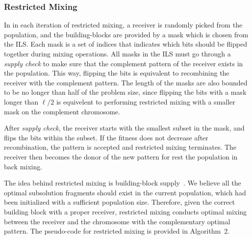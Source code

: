 \documentclass{sig-alternate-05-2015}
\begin{document}
\subsubsection{Restricted Mixing}

In in each iteration of restricted mixing, a receiver is randomly picked from the population, and the building-blocks are provided by a mask which is chosen from the ILS. 
Each mask is a set of indices that indicates which bits should be flipped together during mixing operations. 
All masks in the ILS must go through a \textit{supply check} to make sure that the complement pattern of the receiver exists in the population. 
This way, flipping the bits is equivalent to recombining the receiver with the complement pattern. 
The length of the masks are also bounded to be no longer than half of the problem size, since flipping the bits with a mask longer than $\ell/2$ is equivelent to performing restricted mixing with a smaller mask on the complement chromosome. 


After \textit{supply check}, the receiver starts with the smallest subset in the mask, and flips the bits within the subset. 
If the fitness does not decrease after recombination, the pattern is accepted and restricted mixing terminates. 
The receiver then becomes the donor of the new pattern for rest the population in back mixing. 


The idea behind restricted mixing is building-block supply~\cite{goldberg:buildingblock}. We believe all the optimal subsolution fragments should exist in the current population, which had been initialized with a sufficient population size. Therefore, given the correct building block with a proper receiver, restricted mixing conducts optimal mixing between the receiver and the chromosome with the complementary optimal pattern. 
The pseudo-code for  restricted mixing is provided in Algorithm~2.
\end{document}
